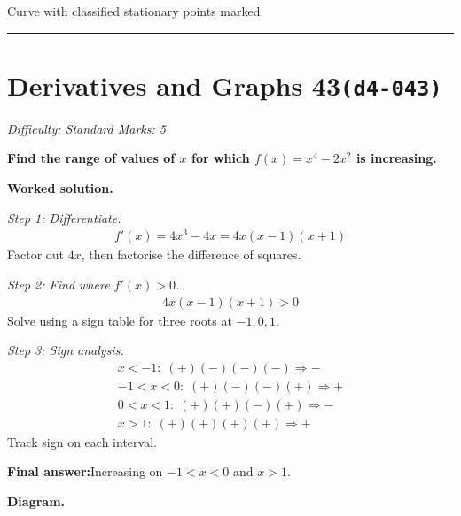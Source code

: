 \documentclass[11pt]{article}
\newcommand{\question}[1]{\par\medskip\noindent\textbf{#1}\par}
\begin{document}
\begin{center}
{
}
\end{center}
\small Curve with classified stationary points marked.\normalsize

\medskip\hrule

\section*{Derivatives and Graphs 43\quad\small\texttt{(d4-043)}}
\textit{Difficulty: Standard \quad\textbar\quad Marks: 5}

\question{Find the range of values of \( x \) for which \( f(x) = x^4 - 2x^2 \) is increasing.}

\textbf{Worked solution.}

\textit{Step 1: Differentiate.}
\[\begin{gathered}
f'(x) = 4x^3 - 4x = 4x(x - 1)(x + 1)
\end{gathered}\]
Factor out \( 4x \), then factorise the difference of squares.

\textit{Step 2: Find where \( f'(x) > 0 \).}
\[\begin{gathered}
4x(x - 1)(x + 1) > 0
\end{gathered}\]
Solve using a sign table for three roots at \( -1, 0, 1 \).

\textit{Step 3: Sign analysis.}
\[\begin{gathered}
x < -1: \; (+)(-)(-)(-) \Rightarrow - \\ -1 < x < 0: \; (+)(-)(-)(+) \Rightarrow + \\ 0 < x < 1: \; (+)(+)(-)(+) \Rightarrow - \\ x > 1: \; (+)(+)(+)(+) \Rightarrow +
\end{gathered}\]
Track sign on each interval.

\begin{answerbox}
\textbf{Final answer:}\quad Increasing on \(\displaystyle  -1 < x < 0 \) and \(\displaystyle  x > 1 \).
\end{answerbox}
\textbf{Diagram.}
\end{document}
